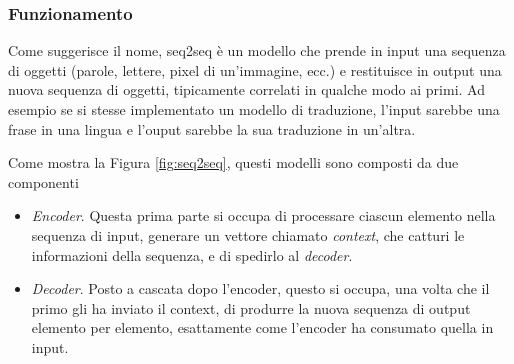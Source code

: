 \documentclass[12pt,a4paper,twoside,openright]{book}
\begin{document}
\subsubsection{Funzionamento}
Come suggerisce il nome, seq2seq è un modello che prende in input una sequenza di oggetti (parole, lettere, pixel di un'immagine, ecc.) e restituisce in output una nuova sequenza di oggetti, tipicamente correlati in qualche modo ai primi. Ad esempio se si stesse implementato un modello di traduzione, l'input sarebbe una frase in una lingua e l'ouput sarebbe la sua traduzione in un'altra.

Come mostra la Figura \ref{fig:seq2seq}, questi modelli sono composti da due componenti
\begin{itemize}
    \item \emph{Encoder}. Questa prima parte si occupa di processare ciascun elemento nella sequenza di input, generare un vettore chiamato \emph{context}, che catturi le informazioni della sequenza, e di spedirlo al \emph{decoder}.
    \item \emph{Decoder}. Posto a cascata dopo l'encoder, questo si occupa, una volta che il primo gli ha inviato il context, di produrre la nuova sequenza di output elemento per elemento, esattamente come l'encoder ha consumato quella in input.
\end{itemize}
\end{document}
